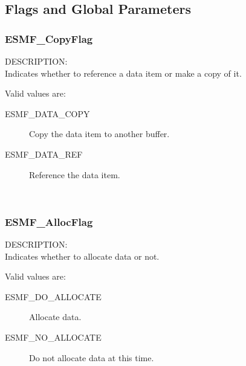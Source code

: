 
\subsection{Flags and Global Parameters}

\subsubsection{ESMF\_CopyFlag}

{\sf DESCRIPTION:\\}
Indicates whether to reference a data item or make a copy of it.

Valid values are:
\begin{description}

\item [ESMF\_DATA\_COPY] 
      Copy the data item to another buffer.

\item [ESMF\_DATA\_REF] 
      Reference the data item.
\end{description}


\mbox{}\hrulefill\

\subsubsection{ESMF\_AllocFlag}

{\sf DESCRIPTION:\\}  
Indicates whether to allocate data or not.

Valid values are:
\begin{description}

\item [ESMF\_DO\_ALLOCATE] 
      Allocate data. 

\item [ESMF\_NO\_ALLOCATE]
      Do not allocate data at this time. 
\end{description}


\mbox{}\hrulefill\
